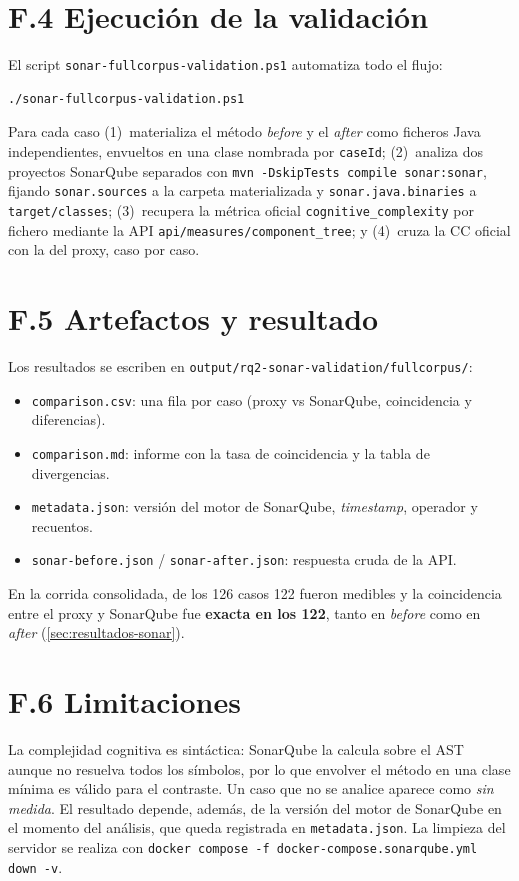\section*{F.4 Ejecución de la validación}
El script \texttt{sonar-fullcorpus-validation.ps1} automatiza todo el flujo:
\begin{lstlisting}[language={},basicstyle=\footnotesize\ttfamily]
./sonar-fullcorpus-validation.ps1
\end{lstlisting}
Para cada caso (1)~materializa el método \emph{before} y el \emph{after} como
ficheros Java independientes, envueltos en una clase nombrada por \texttt{caseId};
(2)~analiza dos proyectos SonarQube separados con
\texttt{mvn -DskipTests compile sonar:sonar}, fijando \texttt{sonar.sources} a la
carpeta materializada y \texttt{sonar.java.binaries} a \texttt{target/classes};
(3)~recupera la métrica oficial \texttt{cognitive\_complexity} por fichero
mediante la API \texttt{api/measures/component\_tree}; y (4)~cruza la CC oficial
con la del proxy, caso por caso.

\section*{F.5 Artefactos y resultado}
Los resultados se escriben en
\texttt{output/rq2-sonar-validation/fullcorpus/}:
\begin{itemize}
  \item \texttt{comparison.csv}: una fila por caso (proxy vs SonarQube,
  coincidencia y diferencias).
  \item \texttt{comparison.md}: informe con la tasa de coincidencia y la tabla
  de divergencias.
  \item \texttt{metadata.json}: versión del motor de SonarQube, \emph{timestamp},
  operador y recuentos.
  \item \texttt{sonar-before.json} / \texttt{sonar-after.json}: respuesta cruda
  de la API.
\end{itemize}
En la corrida consolidada, de los 126 casos 122 fueron medibles y la
coincidencia entre el proxy y SonarQube fue \textbf{exacta en los 122}, tanto en
\emph{before} como en \emph{after} (\autoref{sec:resultados-sonar}).

\section*{F.6 Limitaciones}
La complejidad cognitiva es sintáctica: SonarQube la calcula sobre el AST aunque
no resuelva todos los símbolos, por lo que envolver el método en una clase
mínima es válido para el contraste. Un caso que no se analice aparece como
\emph{sin medida}. El resultado depende, además, de la versión del motor de
SonarQube en el momento del análisis, que queda registrada en
\texttt{metadata.json}. La limpieza del servidor se realiza con
\texttt{docker compose -f docker-compose.sonarqube.yml down -v}.

